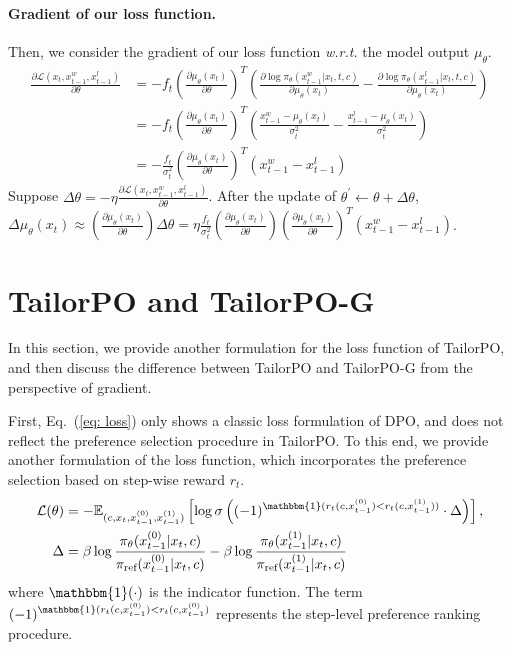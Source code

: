 \paragraph{Gradient of our loss function.}

Then, we consider the gradient of our loss function \emph{w.r.t.} the model output $\mu_\theta$.
\begin{equation}
\begin{aligned}
    \frac{\partial\mathcal{L}(x_t,x_{t-1}^w,x_{t-1}^l)}{\partial \theta}
    & = -f_t(\frac{\partial \mu_\theta(x_t)}{\partial \theta})^T(\frac{\partial\log\pi_\theta(x^w_{t-1}|x_t,t,c)}{\partial \mu_\theta(x_t)} - \frac{\partial\log\pi_\theta(x^l_{t-1}|x_t,t,c)}{\partial \mu_\theta(x_t)}) \\
    & = -f_t(\frac{\partial \mu_\theta(x_t)}{\partial \theta})^T(\frac{x^w_{t-1}-\mu_\theta(x_t)}{\sigma_t^2} - \frac{x^l_{t-1}-\mu_\theta(x_t)}{\sigma_t^2}) \\
    & = -\frac{f_t}{\sigma_t^2}(\frac{\partial \mu_\theta(x_t)}{\partial \theta})^T(x^w_{t-1} - x^l_{t-1})
\end{aligned}
\end{equation}
Suppose $\Delta\theta=-\eta\frac{\partial\mathcal{L}(x_t,x^w_{t-1},x^l_{t-1})}{\partial\theta}$.
After the update of $\theta^\prime\leftarrow\theta+\Delta\theta$, $\Delta \mu_\theta(x_t)\approx (\frac{\partial \mu_\theta(x_t)} {\partial \theta})\Delta\theta
 = \eta\frac{f_t}{\sigma^2_t} (\frac{\partial \mu_\theta(x_t)}{\partial\theta})(\frac{\partial \mu_\theta(x_t)}{\partial\theta})^T  (x^w_{t-1}-x^l_{t-1})$.


\section{TailorPO and TailorPO-G}
\label{sec: app_tailorpo-g}

In this section, we provide another formulation for the loss function of TailorPO, and then discuss the difference between TailorPO and TailorPO-G from the perspective of gradient.

First, Eq.~(\ref{eq: loss}) only shows a classic loss formulation of DPO, and does not reflect the preference selection procedure in TailorPO. To this end, we provide another formulation of the loss function, which incorporates the preference selection based on step-wise reward $r_t$.
\begin{equation}
\begin{aligned}
    \mathcal{L}(\theta) &= -\mathbb{E}_{(c,x_{t},x^{(0)}_{t-1}, x^{(1)}_{t-1})} \left[\log \sigma \left((-1)^{\mathbbm{1}(r_t(c,x^{(0)}_{t-1})<r_t(c,x^{(1)}_{t-1}))} \cdot \Delta\right)\right] ,\\
    \Delta &= \beta\log \frac{\pi_\theta(x^{(0)}_{t-1}|x_{t}, c)}{\pi_\text{ref}(x^{(0)}_{t-1}|x_{t}, c)} - \beta\log \frac{\pi_\theta(x^{(1)}_{t-1}|x_{t}, c)}{\pi_\text{ref}(x^{(1)}_{t-1}|x_{t}, c)}  
\end{aligned}
\end{equation}
where $\mathbbm{1}(\cdot)$ is the indicator function. The term $(-1)^{\mathbbm{1}(r_t(c,x^{(0)}_{t-1})<r_t(c,x^{(0)}_{t-1})}$ represents the step-level preference ranking procedure. 


